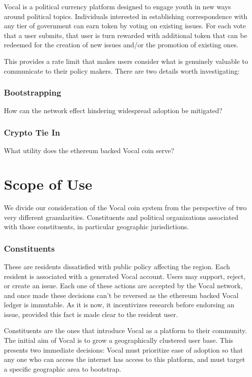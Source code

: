 \documentclass[conference]{IEEEtran}
\begin{document}
    Vocal is a political currency platform designed to engage youth in new ways around political topics. Individuals interested in establishing correspondence with any tier of government can earn token by voting on existing issues. For each vote that a user submits, that user is turn rewarded with additional token that can be redeemed for the creation of new issues and/or the promotion of existing ones.

    This provides a rate limit that makes users consider what is genuinely valuable to communicate to their policy makers. There are two details worth investigating:
  \subsubsection{Bootstrapping} How can the network effect hindering widespread adoption be mitigated?
  \subsubsection{Crypto Tie In} What utility does the ethereum backed Vocal coin serve?


    \section{Scope of Use}

    We divide our consideration of the Vocal coin system from the perspective of two very different granularities. Constituents and political organizations associated with those constituents, in particular geographic jurisdictions. 

    \subsubsection{Constituents}
    These are residents dissatisfied with public policy affecting the region. Each resident is associated with a generated Vocal account. Users may support, reject, or create an issue. Each one of these actions are accepted by the Vocal network, and once made these decisions can't be reversed as the ethereum backed Vocal ledger is immutable. As it is now, it incentivizes research before endorsing an issue, provided this fact is made clear to the resident user.

    Constituents are the ones that introduce Vocal as a platform to their community. The initial aim of Vocal is to grow a geographically clustered user base. This presents two immediate decisions: Vocal must prioritize ease of adoption so that any one who can access the internet has access to this platform, and must target a specific geographic area to bootstrap.
\end{document}
